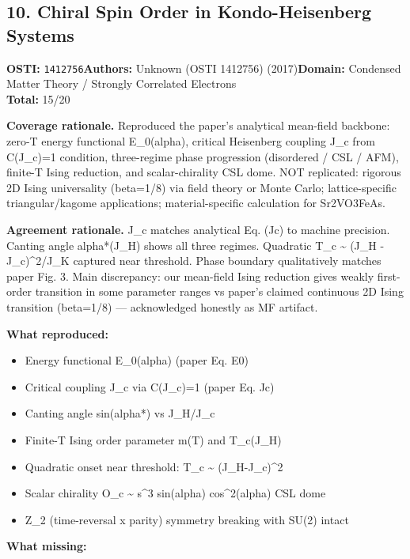 \subsection{10. Chiral Spin Order in Kondo-Heisenberg Systems}
\textbf{OSTI:} \texttt{1412756}\quad\textbf{Authors:} Unknown (OSTI 1412756) (2017)\quad\textbf{Domain:} Condensed Matter Theory / Strongly Correlated Electrons\\
\quad{}\quad\textbf{Total:} 15/20\par\smallskip
\noindent\textbf{Coverage rationale.} Reproduced the paper's analytical mean-field backbone: zero-T energy functional E\_0(alpha), critical Heisenberg coupling J\_c from C(J\_c)=1 condition, three-regime phase progression (disordered / CSL / AFM), finite-T Ising reduction, and scalar-chirality CSL dome. NOT replicated: rigorous 2D Ising universality (beta=1/8) via field theory or Monte Carlo; lattice-specific triangular/kagome applications; material-specific calculation for Sr2VO3FeAs.\par
\noindent\textbf{Agreement rationale.} J\_c matches analytical Eq. (Jc) to machine precision. Canting angle alpha*(J\_H) shows all three regimes. Quadratic T\_c \textasciitilde{} (J\_H - J\_c)\textasciicircum{}2/J\_K captured near threshold. Phase boundary qualitatively matches paper Fig. 3. Main discrepancy: our mean-field Ising reduction gives weakly first-order transition in some parameter ranges vs paper's claimed continuous 2D Ising transition (beta=1/8) --- acknowledged honestly as MF artifact.\par\smallskip
\noindent\textbf{What reproduced:}
\begin{itemize}[leftmargin=1.4em,itemsep=0.2em,topsep=0.2em]
\item Energy functional E\_0(alpha) (paper Eq. E0)
\item Critical coupling J\_c via C(J\_c)=1 (paper Eq. Jc)
\item Canting angle sin(alpha*) vs J\_H/J\_c
\item Finite-T Ising order parameter m(T) and T\_c(J\_H)
\item Quadratic onset near threshold: T\_c \textasciitilde{} (J\_H-J\_c)\textasciicircum{}2
\item Scalar chirality O\_c \textasciitilde{} s\textasciicircum{}3 sin(alpha) cos\textasciicircum{}2(alpha) CSL dome
\item Z\_2 (time-reversal x parity) symmetry breaking with SU(2) intact
\end{itemize}\noindent\textbf{What missing:}
